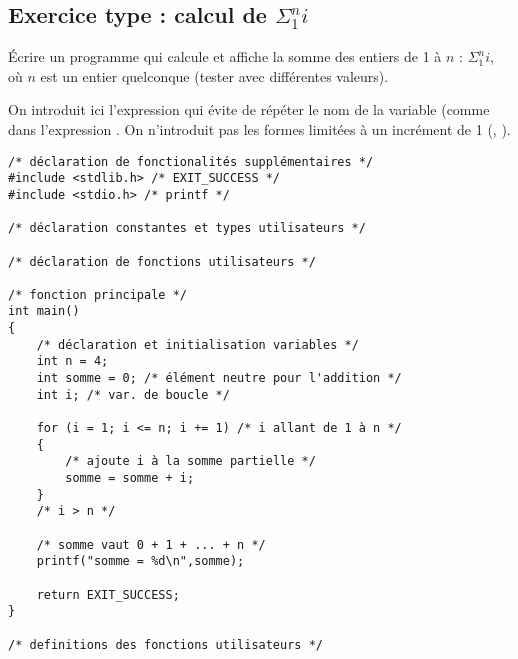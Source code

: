 \subsection{Exercice type : calcul de $\Sigma_1^n i$}

Écrire un programme  qui calcule et affiche la somme des entiers de 1 à
$n$ : $\Sigma_1^n i$, où $n$ est un entier quelconque (tester avec
différentes valeurs).

\begin{correction}
On introduit ici l'expression  qui évite de répéter le nom
de la variable (comme dans l'expression .
On n'introduit pas les formes limitées à un incrément de 1 (,
).
\begin{verbatim}
/* déclaration de fonctionalités supplémentaires */
#include <stdlib.h> /* EXIT_SUCCESS */
#include <stdio.h> /* printf */

/* déclaration constantes et types utilisateurs */

/* déclaration de fonctions utilisateurs */

/* fonction principale */
int main()
{
    /* déclaration et initialisation variables */
    int n = 4;
    int somme = 0; /* élément neutre pour l'addition */
    int i; /* var. de boucle */

    for (i = 1; i <= n; i += 1) /* i allant de 1 à n */
    {
        /* ajoute i à la somme partielle */
        somme = somme + i;
    }
    /* i > n */

    /* somme vaut 0 + 1 + ... + n */
    printf("somme = %d\n",somme);

    return EXIT_SUCCESS;
}

/* definitions des fonctions utilisateurs */
\end{verbatim}
\end{correction}

